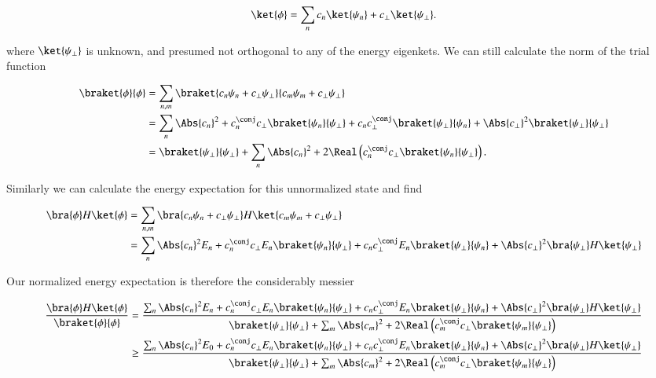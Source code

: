 \begin{equation}\label{eqn:variationHarmonicOscillator:270}
\ket{\phi} = \sum_n c_n \ket{\psi_n} + c_\perp \ket{\psi_\perp}.
\end{equation}

where $\ket{\psi_\perp}$ is unknown, and presumed not orthogonal to any of the energy eigenkets.  We can still calculate the norm of the trial function

\begin{align*}
\braket{\phi}{\phi}
&=
\sum_{n,m} \braket{ c_n \psi_n + c_\perp \psi_\perp}{ c_m \psi_m + c_\perp \psi_\perp} \\
&=
\sum_n \Abs{c_n}^2 
+ c_n^\conj c_\perp 
\braket{\psi_n}{\psi_\perp}
+ c_n c_\perp^\conj \braket{\psi_\perp}{\psi_n}
+ \Abs{c_\perp}^2
\braket{\psi_\perp}{\psi_\perp} \\
&=
\braket{\psi_\perp}{\psi_\perp} +
\sum_n \Abs{c_n}^2 + 2 \Real \left(c_n^\conj c_\perp \braket{\psi_n}{\psi_\perp} \right).
\end{align*}

Similarly we can calculate the energy expectation for this unnormalized state and find

\begin{align*}
\bra{\phi} H \ket{\phi}
&=
\sum_{n,m} \bra{ c_n \psi_n + c_\perp \psi_\perp} H \ket{ c_m \psi_m + c_\perp \psi_\perp} \\
&=
\sum_n \Abs{c_n}^2 E_n
+ c_n^\conj c_\perp E_n
\braket{\psi_n}{\psi_\perp}
+ c_n c_\perp^\conj E_n \braket{\psi_\perp}{\psi_n}
+ \Abs{c_\perp}^2
\bra{\psi_\perp} H \ket{\psi_\perp} 
\end{align*}

Our normalized energy expectation is therefore the considerably messier

\begin{equation}\label{eqn:variationHarmonicOscillator:290}
\begin{aligned}
\frac{\bra{\phi} H \ket{\phi}}{
\braket{\phi}{\phi}
}
&=
\frac{
\sum_n \Abs{c_n}^2 E_n
+ c_n^\conj c_\perp E_n
\braket{\psi_n}{\psi_\perp}
+ c_n c_\perp^\conj E_n \braket{\psi_\perp}{\psi_n}
+ \Abs{c_\perp}^2
\bra{\psi_\perp} H \ket{\psi_\perp} 
}
{
\braket{\psi_\perp}{\psi_\perp} +
\sum_m \Abs{c_m}^2 + 2 \Real \left(c_m^\conj c_\perp \braket{\psi_m}{\psi_\perp} \right)
} \\
&\ge 
\frac{
\sum_n \Abs{c_n}^2 E_0
+ c_n^\conj c_\perp E_n
\braket{\psi_n}{\psi_\perp}
+ c_n c_\perp^\conj E_n \braket{\psi_\perp}{\psi_n}
+ \Abs{c_\perp}^2
\bra{\psi_\perp} H \ket{\psi_\perp} 
}
{
\braket{\psi_\perp}{\psi_\perp} +
\sum_m \Abs{c_m}^2 + 2 \Real \left(c_m^\conj c_\perp \braket{\psi_m}{\psi_\perp} \right)
}
\end{aligned}
\end{equation}

